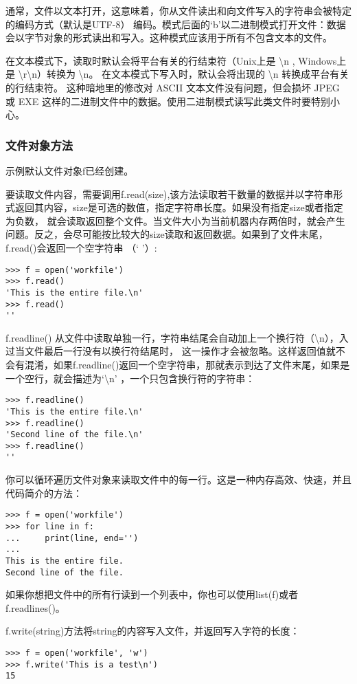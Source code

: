 \documentclass[UTF8]{ctexart}
\begin{document}
通常，文件以文本打开，这意味着，你从文件读出和向文件写入的字符串会被特定的编码方式（默认是UTF-8）
编码。模式后面的`b'以二进制模式打开文件：数据会以字节对象的形式读出和写入。这种模式应该用于所有不包含文本的文件。

在文本模式下，读取时默认会将平台有关的行结束符（Unix上是 \textbackslash n , Windows上是 \textbackslash r\textbackslash n）转换为 \textbackslash n。
在文本模式下写入时，默认会将出现的 \textbackslash n 转换成平台有关的行结束符。
这种暗地里的修改对 ASCII 文本文件没有问题，但会损坏 JPEG 或 EXE 这样的二进制文件中的数据。使用二进制模式读写此类文件时要特别小心。

\subsubsection{文件对象方法}
示例默认文件对象f已经创建。

要读取文件内容，需要调用f.read(size),该方法读取若干数量的数据并以字符串形式返回其内容，size是可选的数值，指定字符串长度。如果没有指定size或者指定为负数，
就会读取返回整个文件。当文件大小为当前机器内存两倍时，就会产生问题。反之，会尽可能按比较大的size读取和返回数据。如果到了文件末尾，f.read()会返回一个空字符串
（` '）:
\begin{verbatim}
>>> f = open('workfile')
>>> f.read()
'This is the entire file.\n'
>>> f.read()
''
\end{verbatim}

f.readline() 从文件中读取单独一行，字符串结尾会自动加上一个换行符（\textbackslash n），入过当文件最后一行没有以换行符结尾时，
这一操作才会被忽略。这样返回值就不会有混淆，如果f.readline()返回一个空字符串，那就表示到达了文件末尾，如果是一个空行，就会描述为`\textbackslash n'
，一个只包含换行符的字符串：
\begin{verbatim}
>>> f.readline()
'This is the entire file.\n'
>>> f.readline()
'Second line of the file.\n'
>>> f.readline()
''
\end{verbatim}

你可以循环遍历文件对象来读取文件中的每一行。这是一种内存高效、快速，并且代码简介的方法：
\begin{verbatim}
>>> f = open('workfile')
>>> for line in f:
...     print(line, end='')
...
This is the entire file.
Second line of the file.
\end{verbatim}

如果你想把文件中的所有行读到一个列表中，你也可以使用list(f)或者f.readlines()。

f.write(string)方法将string的内容写入文件，并返回写入字符的长度：
\begin{verbatim}
>>> f = open('workfile', 'w')
>>> f.write('This is a test\n')
15
\end{verbatim}
\end{document}
